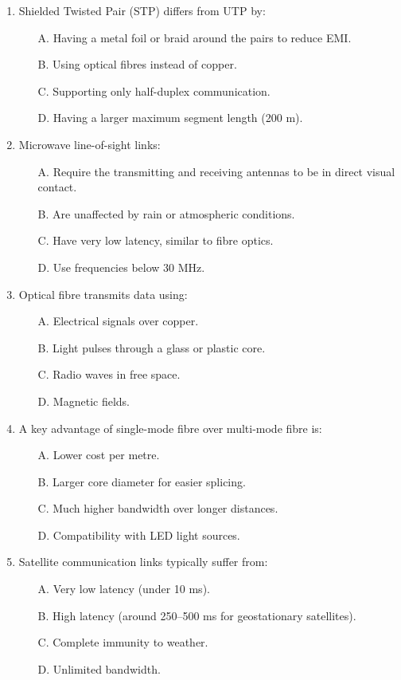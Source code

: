 \documentclass[11pt]{article}
\begin{document}
\begin{exercice}
\begin{enumerate}
\item Shielded Twisted Pair (STP) differs from UTP by:
\begin{itemize}
\item[A.] Having a metal foil or braid around the pairs to reduce EMI.
\item[B.] Using optical fibres instead of copper.
\item[C.] Supporting only half-duplex communication.
\item[D.] Having a larger maximum segment length (200 m).
\end{itemize}

\item Microwave line-of-sight links:
\begin{itemize}
\item[A.] Require the transmitting and receiving antennas to be in direct visual contact.
\item[B.] Are unaffected by rain or atmospheric conditions.
\item[C.] Have very low latency, similar to fibre optics.
\item[D.] Use frequencies below 30 MHz.
\end{itemize}

\item Optical fibre transmits data using:
\begin{itemize}
\item[A.] Electrical signals over copper.
\item[B.] Light pulses through a glass or plastic core.
\item[C.] Radio waves in free space.
\item[D.] Magnetic fields.
\end{itemize}

\item A key advantage of single-mode fibre over multi-mode fibre is:
\begin{itemize}
\item[A.] Lower cost per metre.
\item[B.] Larger core diameter for easier splicing.
\item[C.] Much higher bandwidth over longer distances.
\item[D.] Compatibility with LED light sources.
\end{itemize}

\item Satellite communication links typically suffer from:
\begin{itemize}
\item[A.] Very low latency (under 10 ms).
\item[B.] High latency (around 250–500 ms for geostationary satellites).
\item[C.] Complete immunity to weather.
\item[D.] Unlimited bandwidth.
\end{itemize}


\end{enumerate}
\end{exercice}
\end{document}

